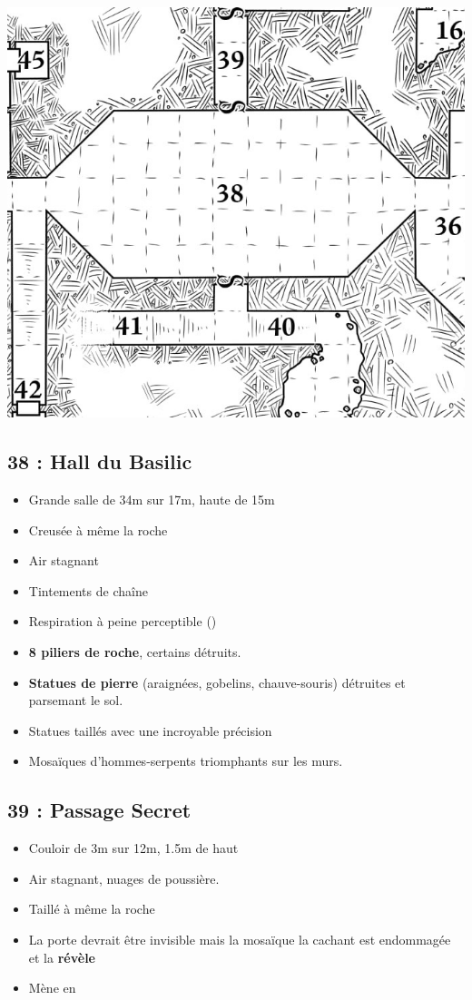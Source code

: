 \vfill
\pagebreak
\includegraphics[width=\columnwidth]{pics/map_38-42.jpg}

\subsection{38 : Hall du Basilic}\label{n3:s38}
\begin{itemize}
  \item Grande salle de 34m sur 17m, haute de 15m
  \item Creusée à même la roche
  \item Air stagnant
  \item Tintements de chaîne
  \item Respiration à peine perceptible (\textbf{})
  \item \textbf{8 piliers de roche}, certains détruits.
  \item \textbf{Statues de pierre} (araignées, gobelins, chauve-souris) détruites et parsemant le sol. 
  \item Statues taillés avec une incroyable précision
  \item Mosaïques d’hommes-serpents triomphants sur les murs.
\end{itemize}

\subsection{39 : Passage Secret}\label{n3:s39}
\begin{itemize}
  \item Couloir de 3m sur 12m, 1.5m de haut
  \item Air stagnant, nuages de poussière.
  \item Taillé  à même la roche
  \item La porte devrait être invisible mais la mosaïque la cachant est endommagée et la \textbf{révèle} 
  \item Mène en \textbf{}
\end{itemize}

